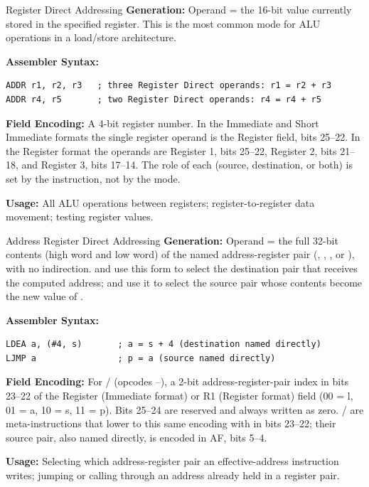 \begin{addrmodebox}{Register Direct Addressing}
	\textbf{Generation:} Operand = the 16-bit value currently stored in the specified register. This is the most
	common mode for ALU operations in a load/store architecture.

	\textbf{Assembler Syntax:}
	\begin{lstlisting}
ADDR r1, r2, r3   ; three Register Direct operands: r1 = r2 + r3
ADDR r4, r5       ; two Register Direct operands: r4 = r4 + r5
	\end{lstlisting}

	\textbf{Field Encoding:} A 4-bit register number. In the Immediate and Short Immediate formats the single register operand is the Register field, bits 25--22. In the Register format the operands are Register 1, bits 25--22, Register 2, bits 21--18, and Register 3, bits 17--14. The role of each (source, destination, or both) is set by the instruction, not by the mode.

	\textbf{Usage:} All ALU operations between registers; register-to-register data movement; testing register
	values.
\end{addrmodebox}

\begin{addrmodebox}{Address Register Direct Addressing}
	\textbf{Generation:} Operand = the full 32-bit contents (high word and low word) of the named address-register
	pair (, , , or ), with no indirection.  and  use this
	form to select the destination pair that receives the computed address;  and 
	use it to select the source pair whose contents become the new value of .

	\textbf{Assembler Syntax:}
	\begin{lstlisting}
LDEA a, (#4, s)       ; a = s + 4 (destination named directly)
LJMP a                ; p = a (source named directly)
	\end{lstlisting}

	\textbf{Field Encoding:} For / (opcodes --), a 2-bit
	address-register-pair index in bits 23--22 of the Register (Immediate format) or R1 (Register format) field
	(00 = l, 01 = a, 10 = s, 11 = p). Bits 25--24 are reserved and always written as zero.
	/ are meta-instructions that lower to this same encoding with  in bits 23--22; their source pair, also named directly, is encoded in AF,
	bits 5--4.

	\textbf{Usage:} Selecting which address-register pair an effective-address instruction writes; jumping or
	calling through an address already held in a register pair.
\end{addrmodebox}

